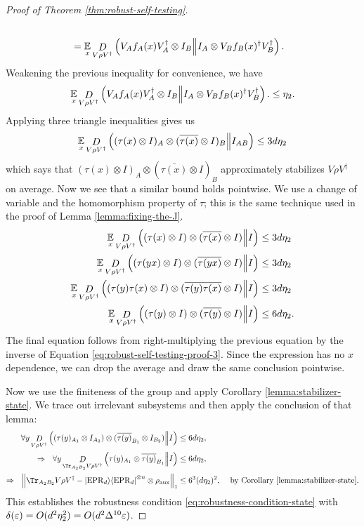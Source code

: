 \begin{proof}[Proof of Theorem \ref{thm:robust-self-testing}]
\begin{align}
		\\&=
		\operatorname*{\mathbb E}\limits_{x}\mathop{D}\limits_{V\rho V^\dagger}\left(V_Af_A(x) V_A^\dagger\otimes I_B\middle\| I_A\otimes V_Bf_B(x)^\dagger V_B^\dagger\right).
	\end{align}
	Weakening the previous inequality for convenience, we have
	\begin{equation}
		\operatorname*{\mathbb E}\limits_{x}\mathop{D}\limits_{V\rho V^\dagger}\left(V_Af_A(x) V_A^\dagger\otimes I_B\middle\| I_A\otimes V_Bf_B(x)^\dagger V_B^\dagger\right).\leq \eta_2.
	\end{equation}
	Applying three triangle inequalities gives us
	\begin{equation}
		\label{eq:robust-self-testing-proof-3}
	 	\operatorname*{\mathbb E}\limits_{x} \mathop{D}\limits_{V\rho V^\dagger}\left((\tau(x)\otimes I)_A\otimes (\overline{\tau(x)}\otimes I)_B\middle\| I_{AB}\right) 
		\leq 3d\eta_2
	 \end{equation}
	 which says that $(\tau(x)\otimes I)_A \otimes (\bar{\tau(x)}\otimes I)_B$ approximately stabilizes $V\rho V^\dagger$ on average. Now we see that a similar bound holds pointwise. We use a change of variable and the homomorphism property of $\tau$; this is the same technique used in the proof of Lemma \ref{lemma:fixing-the-J}.
	\begin{align}
		\operatorname*{\mathbb E}\limits_{x} \mathop{D}\limits_{V\rho V^\dagger}\left((\tau(x)\otimes I)\otimes (\overline{\tau(x)}\otimes I)\middle\| I\right) 
		&\leq 3d\eta_2
		\\
		\operatorname*{\mathbb E}\limits_{x} \mathop{D}\limits_{V\rho V^\dagger}\left((\tau(yx)\otimes I)\otimes (\overline{\tau(yx)}\otimes I)\middle\| I\right) 
		&\leq 3d\eta_2
		\\
		\label{eq:robust-self-testing-proof-4}
		\operatorname*{\mathbb E}\limits_{x} \mathop{D}\limits_{V\rho V^\dagger}\left((\tau(y)\tau(x)\otimes I)\otimes (\overline{\tau(y)\tau(x)}\otimes I)\middle\| I\right) 
		&\leq 3d\eta_2
		\\
		\label{eq:robust-self-testing-proof-5}
		\operatorname*{\mathbb E}\limits_{x} \mathop{D}\limits_{V\rho V^\dagger}\left((\tau(y)\otimes I)\otimes (\overline{\tau(y)}\otimes I)\middle\| I\right) 
		&\leq 6d\eta_2.
	\end{align}
	The final equation follows from right-multiplying the previous equation by the inverse of Equation \eqref{eq:robust-self-testing-proof-3}. Since the expression has no $x$ dependence, we can drop the average and draw the same conclusion pointwise.

	Now we use the finiteness of the group and apply Corollary \ref{lemma:stabilizer-state}.  We trace out irrelevant subsystems and then apply the conclusion of that lemma:
	\begin{align}
		\forall y\drho{V\rho V^\dagger}{(\tau(y)_{A_1}\otimes I_{A_2})\otimes (\bar{\tau(y)}_{B_1}\otimes I_{B_2})}{I} 
		&\leq 6d\eta_2,
		\\
	\Rightarrow	\,\,\,\,\forall y\drho{\Tr_{A_2B_2}V\rho V^\dagger}{\tau(y)_{A_1}\otimes \bar{\tau(y)}_{B_1}}{I} 
		&\leq 6d\eta_2,
		\\
		\Rightarrow \,\,\,\, \norm{\Tr_{A_2B_2}V\rho V^\dagger - \proj\epr^{\otimes n}\otimes \rho_\text{aux}}_1
		&\leq 6^3(d\eta_2)^2, \,\,\,\,\,\,\,\text{by Corollary \ref{lemma:stabilizer-state}}.
	\end{align}
	This establishes the robustness condition \eqref{eq:robustness-condition-state} with $\delta(\varepsilon) = O(d^2\eta_2^2) = O(d^2\Delta^{10}\varepsilon)$.


\end{proof}
